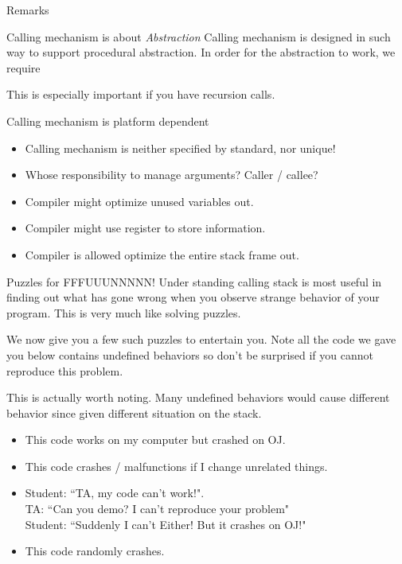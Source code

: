 \begin{frame}{Remarks}
\begin{block}{Calling mechanism is about \textit{Abstraction}}
	Calling mechanism is designed in such way to support procedural abstraction. In order for the abstraction to work, we require
	\begin{center}
	\end{center}
	This is especially important if you have recursion calls.
\end{block}

\begin{block}{Calling mechanism is platform dependent}
	\begin{itemize}
		\item Calling mechanism is neither specified by standard, nor unique!
		\item Whose responsibility to manage arguments? Caller / callee?
		\item Compiler might optimize unused variables out.
		\item Compiler might use register to store information.
		\item Compiler is allowed optimize the entire stack frame out.
	\end{itemize}
\end{block}
\end{frame}

\begin{frame}{Puzzles for \alert{FFFUUUNNNNN}!}
Under standing calling stack is most useful in finding out what has gone wrong when you observe strange behavior of your program. This is very much like solving puzzles.

We now give you a few such puzzles to entertain you. Note all the code we gave you below contains \alert{undefined behaviors} so don't be surprised if you cannot reproduce this problem.

This is actually worth noting. Many undefined behaviors would cause different behavior since given different situation on the stack. 

\begin{itemize}
	\item This code works on my computer but crashed on OJ.
	\item This code crashes / malfunctions if I change unrelated things.
	\item Student: ``TA, my code can't work!". \\
	      TA\qquad: ``Can you demo? I can't reproduce your problem"\\
	      Student: ``Suddenly I can't Either! But it crashes on OJ!"
	\item This code randomly crashes.
\end{itemize} 
\end{frame}


